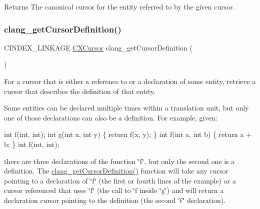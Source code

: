 \begin{DoxyReturn}{Returns}
The canonical cursor for the entity referred to by the given cursor. 
\end{DoxyReturn}
\mbox{\label{group__CINDEX__CURSOR__XREF_gafcfbec461e561bf13f1e8540bbbd655b}} 
\subsubsection{\texorpdfstring{clang\+\_\+get\+Cursor\+Definition()}{clang\_getCursorDefinition()}}
{\footnotesize\ttfamily C\+I\+N\+D\+E\+X\+\_\+\+L\+I\+N\+K\+A\+GE \mbox{\hyperlink{structCXCursor}{C\+X\+Cursor}} clang\+\_\+get\+Cursor\+Definition (\begin{DoxyParamCaption}\item[{\mbox{\hyperlink{structCXCursor}{C\+X\+Cursor}}}]{ }\end{DoxyParamCaption})}



For a cursor that is either a reference to or a declaration of some entity, retrieve a cursor that describes the definition of that entity. 

Some entities can be declared multiple times within a translation unit, but only one of those declarations can also be a definition. For example, given\+:


\begin{DoxyCode}
\textcolor{keywordtype}{int} f(\textcolor{keywordtype}{int}, \textcolor{keywordtype}{int});
\textcolor{keywordtype}{int} g(\textcolor{keywordtype}{int} x, \textcolor{keywordtype}{int} y) \{ \textcolor{keywordflow}{return} f(x, y); \}
\textcolor{keywordtype}{int} f(\textcolor{keywordtype}{int} a, \textcolor{keywordtype}{int} b) \{ \textcolor{keywordflow}{return} a + b; \}
\textcolor{keywordtype}{int} f(\textcolor{keywordtype}{int}, \textcolor{keywordtype}{int});
\end{DoxyCode}


there are three declarations of the function \char`\"{}f\char`\"{}, but only the second one is a definition. The \mbox{\hyperlink{group__CINDEX__CURSOR__XREF_gafcfbec461e561bf13f1e8540bbbd655b}{clang\+\_\+get\+Cursor\+Definition()}} function will take any cursor pointing to a declaration of \char`\"{}f\char`\"{} (the first or fourth lines of the example) or a cursor referenced that uses \char`\"{}f\char`\"{} (the call to \char`\"{}f\textquotesingle{} inside \char`\"{}g\char`\"{}) and will return a
declaration cursor pointing to the definition (the second \char`\"{}f" declaration).

